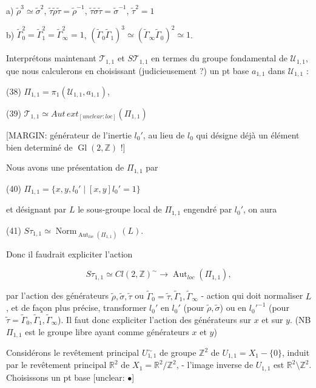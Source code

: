 a) $\tilde{\rho}^3 \simeq \tilde{\sigma}^2$, $\tilde{\tau} \tilde{\rho} \tilde{\tau} = \tilde{\rho}^{-1}$, $\tilde{\tau} \tilde{\sigma} \tilde{\tau} = \tilde{\sigma}^{-1}$, $\tilde{\tau}^2 = 1$

b) $\tilde{\Gamma}_0^2 = \tilde{\Gamma}_1^2 = \tilde{\Gamma}_\infty^2 = 1$, $(\tilde{\Gamma}_0 \tilde{\Gamma}_1)^3 \simeq (\tilde{\Gamma}_\infty \tilde{\Gamma}_0)^2 \simeq 1$.

Interprétons maintenant $\mathcal{T}_{1,1}$ et $S \mathcal{T}_{1,1}$
en termes du groupe fondamental
de $\mathcal{U}_{1,1}$, que nous calculerons en
choisissant (judicieusement ?) un
pt base $a_{1,1}$ dans $\mathcal{U}_{1,1}$ :

(38) $\Pi_{1,1} = \pi_1(\mathcal{U}_{1,1}, a_{1,1})$,

(39) $\mathcal{T}_{1,1} \simeq Aut \, ext_{[unclear: loc]}(\Pi_{1,1})$

\newpage


[MARGIN: générateur de l'inertie $l_0'$, au lieu de $l_0$ qui désigne déjà un élément bien determiné de $\operatorname{Gl}(2, \mathbb{Z})$ !]

Nous avons une présentation de $\Pi_{1,1}$ par

(40) $\Pi_{1,1} = \{ x, y, l_0' \mid [x,y] l_0' = 1 \}$

et désignant par $L$ le sous-groupe local de $\Pi_{1,1}$ engendré par $l_0'$, on aura

(41) $S\tau_{1,1} \simeq \operatorname{Norm}_{\operatorname{Aut}_{loc}(\Pi_{1,1})}(L)$.

Donc il faudrait expliciter l'action

$$S\tau_{1,1} \simeq Cl(2, \mathbb{Z})^\sim \to \operatorname{Aut}_{loc}(\Pi_{1,1}) ,$$

par l'action des générateurs $\tilde{\rho}, \tilde{\sigma}, \tilde{\tau}$
ou $\tilde{\Gamma}_0 = \tilde{\tau}, \tilde{\Gamma}_1, \tilde{\Gamma}_\infty$ - action qui doit
normaliser $L$, et de façon plus
précise, transformer $l_0'$ en $l_0'$ (pour $\tilde{\rho}, \tilde{\sigma}$)
ou en ${l_0'}^{-1}$ (pour $\tilde{\tau} = \tilde{\Gamma}_0, \tilde{\Gamma}_1, \tilde{\Gamma}_\infty$). Il faut
donc expliciter l'action des générateurs
sur $x$ et sur $y$. (NB $\Pi_{1,1}$ est le groupe
libre ayant comme générateurs $x$ et $y$)

Considérons le revêtement principal $U_{1,1}^\sim$
de groupe $\mathbb{Z}^2$ de $U_{1,1} = X_1 - \{0\}$, induit
par le revêtement principal $\mathbb{R}^2$ de $X_1 = \mathbb{R}^2/\mathbb{Z}^2$,
- l'image inverse de $U_{1,1}$ est $\mathbb{R}^2 \setminus \mathbb{Z}^2$.
Choisissons un pt base [unclear: $\bullet$]

